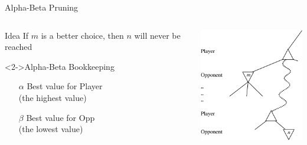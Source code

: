 \documentclass[14pt]{beamer}
\begin{document}
\begin{frame}{Alpha-Beta Pruning}
	\begin{columns}
		\begin{column}{2in}
			\begin{block}{Idea}
				If $m$ is a better choice, then $n$ will never be reached
			\end{block}
			\begin{block}<2->{Alpha-Beta Bookkeeping}
				\begin{itemize}
					\item[$\alpha$] Best value for Player \\ (the highest value)
					\item[$\beta$] Best value for Opp \\ (the lowest value)
				\end{itemize}
			\end{block}
		\end{column}
		\begin{column}{2in}
			\begin{center}
				\includegraphics[width=2in]{alpha-beta-general.pdf}
			\end{center}
		\end{column}
	\end{columns}
\end{frame}
\end{document}
